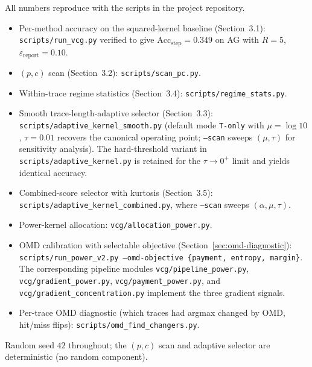 \documentclass[11pt]{article}
\begin{document}
All numbers reproduce with the scripts in the project repository.
\begin{sloppypar}
\begin{itemize}[nosep]
\item Per-method accuracy on the squared-kernel baseline (Section~3.1):
\texttt{scripts/run\_vcg.py} verified to give
$\mathrm{Acc}_{\mathrm{step}} = 0.349$ on AG with $R = 5$,
$\varepsilon_{\text{report}} = 0.10$.
\item $(p, c)$ scan (Section~3.2): \texttt{scripts/scan\_pc.py}.
\item Within-trace regime statistics (Section~3.4):
\texttt{scripts/regime\_stats.py}.
\item Smooth trace-length-adaptive selector (Section~3.3):
\texttt{scripts/adaptive\_kernel\_smooth.py}
(default mode \texttt{T-only} with
$\mu = \log 10$, $\tau = 0.01$ recovers the canonical operating point;
\texttt{--scan} sweeps $(\mu, \tau)$ for sensitivity analysis).
The hard-threshold variant in
\texttt{scripts/adaptive\_kernel.py}
is retained for the $\tau \to 0^+$ limit and yields identical accuracy.
\item Combined-score selector with kurtosis (Section~3.5):
\texttt{scripts/adaptive\_kernel\_combined.py},
where \texttt{--scan} sweeps $(\alpha, \mu, \tau)$.
\item Power-kernel allocation: \texttt{vcg/allocation\_power.py}.
\item OMD calibration with selectable objective
(Section~\ref{sec:omd-diagnostic}):
\texttt{scripts/run\_power\_v2.py --omd-objective \{payment, entropy, margin\}}.
The corresponding pipeline modules \texttt{vcg/pipeline\_power.py},
\texttt{vcg/gradient\_power.py}, \texttt{vcg/payment\_power.py},
and \texttt{vcg/gradient\_concentration.py} implement the three
gradient signals.
\item Per-trace OMD diagnostic (which traces had argmax changed by OMD,
hit/miss flips): \texttt{scripts/omd\_find\_changers.py}.
\end{itemize}
\end{sloppypar}
Random seed $42$ throughout; the $(p, c)$ scan and adaptive selector are
deterministic (no random component).
\end{document}
